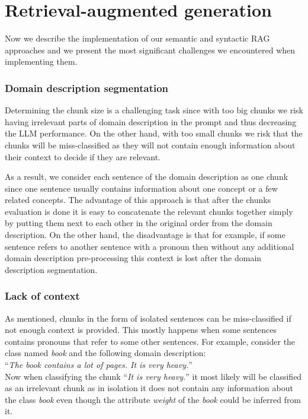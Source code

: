 \section{Retrieval-augmented generation}
\label{sec:rag_implementation}

Now we describe the implementation of our semantic and syntactic RAG approaches and we present the most significant challenges we encountered when implementing them.


\subsubsection{Domain description segmentation}

Determining the chunk size is a challenging task since with too big chunks we risk having irrelevant parts of domain description in the prompt and thus decreasing the LLM performance. On the other hand, with too small chunks we risk that the chunks will be miss-classified as they will not contain enough information about their context to decide if they are relevant.

As a result, we consider each sentence of the domain description as one chunk since one sentence usually contains information about one concept or a few related concepts. The advantage of this approach is that after the chunks evaluation is done it is easy to concatenate the relevant chunks together simply by putting them next to each other in the original order from the domain description. On the other hand, the disadvantage is that for example, if some sentence refers to another sentence with a pronoun then without any additional domain description pre-processing this context is lost after the domain description segmentation.


\subsubsection{Lack of context}

As mentioned, chunks in the form of isolated sentences can be miss-classified if not enough context is provided. This mostly happens when some sentences contains pronouns that refer to some other sentences. For example, consider the class named \textit{book} and the following domain description: \\

\noindent{}``\textit{The book contains a lot of pages. It is very heavy.}'' \\

\noindent{}Now when classifying the chunk ``\textit{It is very heavy.}'' it most likely will be classified as an irrelevant chunk as in isolation it does not contain any information about the class \textit{book} even though the attribute \textit{weight} of the \textit{book} could be inferred from it.

